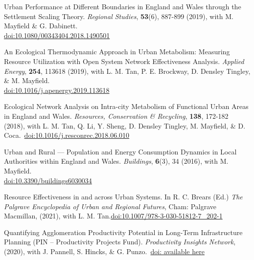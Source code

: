 \documentclass[10pt]{article}
\renewcommand{\section}[1]{\pagebreak[3]%
    \vspace{1.3\baselineskip}%
    \phantomsection\addcontentsline{toc}{section}{#1}%
    \noindent\llap{\large\smash{\parbox[t]{\marginparwidth}{\raggedright #1}}}%
    \vspace{-\baselineskip}\par}
\begin{document}
\begin{etaremune}[leftmargin=0ex, topsep=0ex]
	\item Urban Performance at Different Boundaries in England and Wales through the Settlement Scaling Theory. \emph{Regional Studies}, \textbf{53}(6), 887-899 (2019), with M. Mayfield \& G. Dabinett.~\\\href{http://dx.doi.org/10.1080/00343404.2018.1490501}{doi:10.1080/00343404.2018.1490501}

	\item An Ecological Thermodynamic Approach in Urban Metabolism: Measuring Resource Utilization with Open System Network Effectiveness Analysis. \emph{Applied Energy}, \textbf{254}, 113618 (2019), with L. M. Tan, P. E. Brockway, D. Densley Tingley, \& M. Mayfield.~\\\href{https://doi.org/10.1016/j.apenergy.2019.113618}{doi:10.1016/j.apenergy.2019.113618}
			
	\item Ecological Network Analysis on Intra-city Metabolism of Functional Urban Areas in England and Wales. \emph{Resources, Conservation \& Recycling}, \textbf{138}, 172-182 (2018), with L. M. Tan, Q. Li, Y. Sheng, D. Densley Tingley, M. Mayfield, \& D. Coca.~\href{https//doi.org/10.1016/j.resconrec.2018.06.010}{doi:10.1016/j.resconrec.2018.06.010}\label{sure.net}

	\item Urban and Rural --- Population and Energy Consumption Dynamics in Local Authorities within England and Wales. \emph{Buildings}, \textbf{6}(3), 34 (2016), with M. Mayfield.~\\\href{http://dx.doi.org/10.3390/buildings6030034}{doi:10.3390/buildings6030034}
	
\end{etaremune}
\renewcommand{\labelenumi}{R\theenumi.}
\section{Chapters \&\\Reports}
\begin{etaremune}[leftmargin=0ex, topsep=0ex]
	\item Resource Effectiveness in and across Urban Systems. In R. C. Brears (Ed.) \emph{The Palgrave Encyclopedia of Urban and Regional Futures}, Cham: Palgrave Macmillan, (2021), with L. M. Tan.\href{https://dx.doi.org/10.1007/978-3-030-51812-7_202-1}{doi:10.1007/978-3-030-51812-7\_202-1}
	
	\item Quantifying Agglomeration Productivity Potential in Long-Term
	Infrastructure Planning (PIN – Productivity Projects Fund). \emph{Productivity Insights Network}, (2020), with J. Pannell, S. Hincks, \& G. Punzo.~\href{https://productivityinsightsnetwork.co.uk/app/uploads/2020/07/20200702-PIN-Small-Project-Report-Arbabi-et-al.pdf}{doi: available here}\label{rpin}
\end{etaremune}
\renewcommand{\labelenumi}{O\theenumi.}
\end{document}
